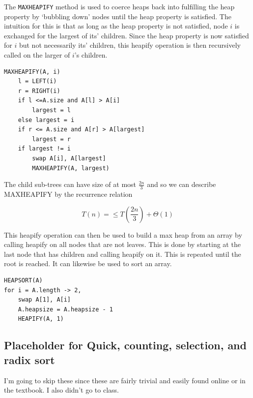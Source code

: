 \documentclass[../notes.tex]{subfiles}
\begin{document}
The \texttt{MAXHEAPIFY} method is used to coerce heaps back into fulfilling the heap property by `bubbling down' nodes until the heap property is satisfied.
The intuition for this is that as long as the heap property is not satisfied, node $ i $ is exchanged for the largest of its' children. Since the heap property is now satisfied for $ i $ but not necessarily its' children, this heapify operation is then recursively called on the larger of $ i $'s children.

\begin{listing}[H]
\begin{verbatim}
MAXHEAPIFY(A, i)
	l = LEFT(i)
	r = RIGHT(i)
	if l <=A.size and A[l] > A[i]
		largest = l
	else largest = i
	if r <= A.size and A[r] > A[largest]
		largest = r
	if largest != i
		swap A[i], A[largest]
		MAXHEAPIFY(A, largest)
\end{verbatim}
\end{listing}


The child sub-trees can have size of at most $ \frac{2n}{3} $ and so we can describe MAXHEAPIFY by the recurrence relation

\begin{equation}
	T(n) = \le  T(\frac{2n}{3}) + \Theta(1)
\end{equation}





This heapify operation can then be used to build a max heap from an array by calling heapify on all nodes that are not leaves. This is done by starting at the last node that has children and calling heapify on it. This is repeated until the root is reached. It can likewise be used to sort an array.



\begin{listing}[H]
\begin{verbatim}
HEAPSORT(A)
for i = A.length -> 2,
	swap A[1], A[i]
	A.heapsize = A.heapsize - 1
	HEAPIFY(A, 1)
\end{verbatim}
\end{listing}



\subsection{Placeholder for Quick, counting, selection, and radix sort}

I'm going to skip these since these are fairly trivial and easily found online or in the textbook. I also didn't go to class.
\end{document}
